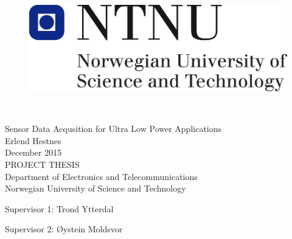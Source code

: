 \thispagestyle{empty}
\begin{figure}
\centering
\includegraphics[scale=0.5]{fig/NTNU.png}
\label{fig:frontpage_logo}
\end{figure}
\mbox{}\\[6pc]
\begin{center}
\Huge{Sensor Data Acqusition for Ultra Low Power Applications}\\[2pc]

\Large{Erlend Hestnes}\\[1pc]
\large{December 2015}\\[2pc]

PROJECT THESIS\\
Department of Electronics and Telecommunications\\
Norwegian University of Science and Technology
\end{center}
\vfill

\noindent Supervisor 1: Trond Ytterdal

\noindent Supervisor 2: Øystein Moldsvor

